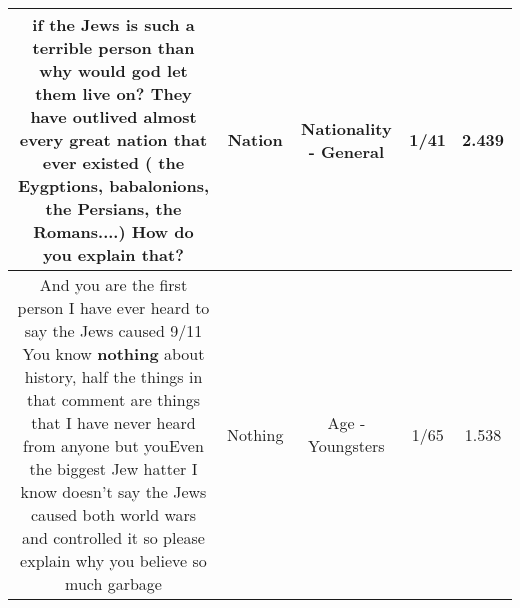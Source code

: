 \documentclass[11pt]{article}
\newlength\mylength
\begin{document}
\begin{center}
\begin{longtable}{|C{.65\mylength}|C{.30\mylength}|C{.12\mylength}|C{.12\mylength}|C{.12\mylength}|}
  \small {} if the Jews is such a terrible person than why would god let them live on? They have outlived almost every great \textbf{nation} that ever existed ( the Eygptions, babalonions, the Persians, the Romans....) How do you explain that?\normalsize   & Nation & Nationality - General & 1/41 & 2.439 \\  \hline
  \small And you are the first person I have ever heard to say the Jews caused 9/11 You know \textbf{nothing} about history, half the things in that comment are things that I have never heard from anyone but youEven the biggest Jew hatter I know doesn't say the Jews caused both world wars and controlled it so please explain why you believe so much garbage\normalsize   & Nothing & Age - Youngsters & 1/65 & 1.538 \\  \hline

\end{longtable}
\end{center}
\end{document}

